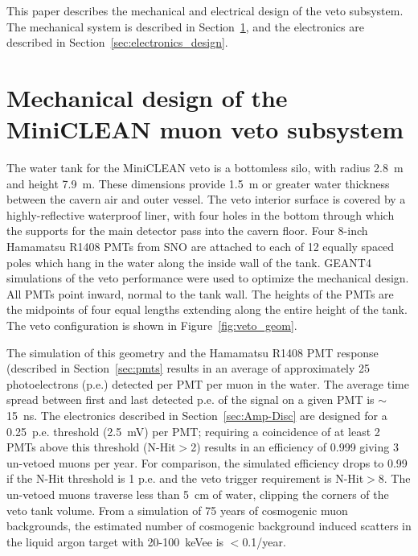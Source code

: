 \documentclass[pdftex]{JINST}
\begin{document}
This paper describes the mechanical and electrical design of the veto
subsystem. The mechanical system is described in
Section~\ref{sec:subsystem_design}, and the electronics are
described in Section~\ref{sec:electronics_design}.


\section{Mechanical design of the MiniCLEAN muon veto subsystem}
\label{sec:subsystem_design}
%
The water tank for the MiniCLEAN veto is a bottomless silo, with
radius 2.8~m and height 7.9~m. These dimensions provide 1.5~m or
greater water thickness between the cavern air and outer vessel. The
veto interior surface is covered by a highly-reflective waterproof liner, with four
holes in the bottom through which the supports for the main detector
pass into the cavern floor. Four 8-inch Hamamatsu R1408 PMTs from SNO are
attached to each of 12 equally spaced poles which hang in the water
along the inside wall of the tank. GEANT4~\cite{ref:geant4} simulations
of the veto performance were used to optimize the mechanical
design. All PMTs point inward, normal to the tank wall. The heights
of the PMTs are the midpoints of four equal lengths extending along
the entire height of the tank. The veto configuration is shown in
Figure~\ref{fig:veto_geom}. 

The simulation of this geometry and the Hamamatsu R1408 PMT response (described
in Section~\ref{sec:pmts} results in an average of approximately 25
photoelectrons (p.e.) detected per PMT per muon in the water. The
average time spread between first and last detected p.e. of the signal
on a given PMT is $\sim$15~ns. The electronics described in
Section~\ref{sec:Amp-Disc} are designed for a 0.25~p.e. threshold (2.5~mV)
per PMT; requiring a coincidence of at least 2 PMTs above this
threshold (N-Hit$>$2) results in an efficiency of 0.999 giving 3
un-vetoed muons per year. For comparison, the simulated efficiency
drops to 0.99 if the N-Hit threshold is 1 p.e. and the veto trigger
requirement is N-Hit$>$8. The un-vetoed muons traverse less than 5~cm
of water, clipping the corners of the veto tank volume. From a
simulation of 75 years of cosmogenic muon backgrounds, the estimated
number of cosmogenic background induced scatters in the liquid argon
target with 20-100~keVee is $<$0.1/year.
\end{document}
